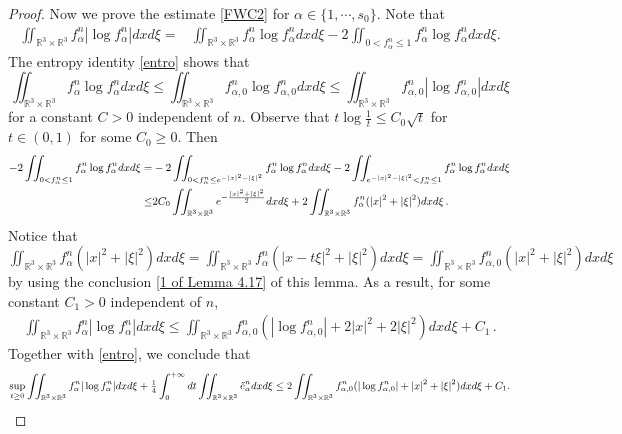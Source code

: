 \documentclass[reqno,11pt]{amsart}
\numberwithin{equation}{section}
\def\R{\mathbb{R}}
\begin{document}
\begin{proof}
Now we prove the estimate \eqref{FWC2} for $\alpha \in \{1, \cdots, s_0 \}$. Note that 
	\begin{equation*}
		\begin{aligned}
			\iint_{ \R^3 \times \R^3} f^n_\alpha|\log f^n_\alpha| dxd\xi 
			=&\iint_{ \R^3 \times \R^3} f^n_\alpha\log f^n_\alpha dxd\xi -2 \iint_{0<f^n_\alpha\leq 1} f^n_\alpha\log f^n_\alpha dxd\xi .
		\end{aligned}
	\end{equation*}
The entropy identity \eqref{entro} shows that 
$$ \iint_{ \R^3 \times \R^3} f^n_\alpha\log f^n_\alpha dxd\xi \leq \iint_{\R^3 \times \R^3} f^n_{\alpha, 0} \log f^n_{ \alpha, 0 } d x d \xi \leq \iint_{\R^3 \times \R^3} f^n_{\alpha, 0} | \log f^n_{ \alpha, 0 } | d x d \xi $$
for a constant $C > 0$ independent of $n$. Observe that $t\log \frac{1}{t}\leq C_0 \sqrt{t}$ for $t\in (0,1)$ for some $C_0\geq 0$. Then
\begin{equation*}{\small
  \begin{aligned}
    -2 \iint_{0<f^n_\alpha\leq 1} f^n_\alpha\log f^n_\alpha dxd\xi = & -2 \iint_{0<f^n_\alpha\leq e^{ - |x|^2 - |\xi|^2 }} f^n_\alpha\log f^n_\alpha dxd\xi - 2 \iint_{e^{ - |x|^2 - |\xi|^2 }<f^n_\alpha\leq 1} f^n_\alpha\log f^n_\alpha dxd\xi \\
    \leq & 2 C_0 \iint_{\R^3 \times \R^3} e^{ - \frac{|x|^2 + |\xi|^2}{2} } d x d \xi + 2 \iint_{\R^3 \times \R^3} f^n_\alpha(|x|^2 +|\xi|^2) dxd\xi \,.
  \end{aligned}}
\end{equation*}
Notice that $\iint_{\R^3 \times \R^3} f^n_\alpha(|x|^2 +|\xi|^2) dxd\xi = \iint_{\R^3 \times \R^3} f^n_\alpha(|x - t \xi|^2 +|\xi|^2) dxd\xi = \iint_{\R^3 \times \R^3} f^n_{\alpha, 0} (|x|^2 +|\xi|^2) dxd\xi$ by using the conclusion \eqref{1 of Lemma 4.17} of this lemma. As a result, for some constant $C_1 > 0$ independent of $n$,
\begin{equation*}
  \begin{aligned}
    \iint_{ \R^3 \times \R^3} f^n_\alpha|\log f^n_\alpha| dxd\xi \leq \iint_{ \R^3 \times \R^3} f^n_{\alpha,0}(|\log f^n_{\alpha,0}|+2|x|^2+2|\xi|^2 )dxd\xi + C_1 \,.
  \end{aligned}
\end{equation*}
Together with \eqref{entro}, we conclude that
	\begin{equation*}{\small
		\begin{aligned}
			\sup \limits_{t\geq 0}\iint_{ \R^3 \times \R^3} f^n_\alpha|\log f^n_\alpha| dxd\xi +\tfrac{1}{4}\int_{0}^{+\infty} dt \iint_{ \R^3 \times \R^3} \tilde{e}^n_\alpha dxd\xi \leq 2 \iint_{ \R^3 \times \R^3} f^n_{\alpha,0}(|\log f^n_{\alpha,0}|+ |x|^2+ |\xi|^2 )dxd\xi +C_1.
		\end{aligned}}
	\end{equation*}


\end{proof}
\end{document}
